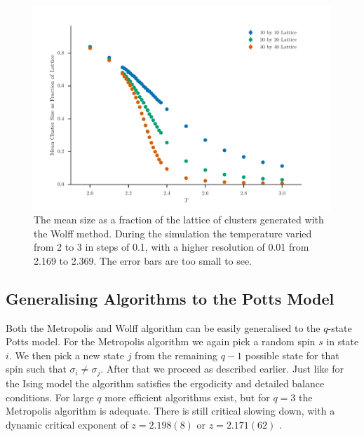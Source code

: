 \documentclass[11pt, a4paper]{report} %
\begin{document}
\begin{figure}[htb]
	\centering
	\includegraphics[width=\textwidth]{wolff_mean_cluster_size_as_fraction_of_lattice.pdf}
	\caption{The mean size as a fraction of the lattice of clusters generated with the Wolff method. During the simulation the temperature varied from 2 to 3 in steps of 0.1, with a higher resolution of 0.01 from 2.169 to 2.369. The error bars are too small to see.}
	\label{fig:wolff_cluster_size}
\end{figure}

\subsection{Generalising Algorithms to the Potts Model}
Both the Metropolis and Wolff algorithm can be easily generalised to the \(q\)-state Potts model.
For the Metropolis algorithm we again pick a random spin \(s\) in state \(i\).
We then pick a new state \(j\) from the remaining \(q-1\) possible state for that spin such that \(\sigma_i \neq \sigma_j\).
After that we proceed as described earlier.
Just like for the Ising model the algorithm satisfies the ergodicity and detailed balance conditions.
For large \(q\) more efficient algorithms exist, but for \(q=3\) the Metropolis algorithm is adequate.
There is still critical slowing down, with a dynamic critical exponent of \(z=2.198(8)\) \cite{newman:1999} or \(z=2.171(62)\) \cite{fan:2007}.
\end{document}

